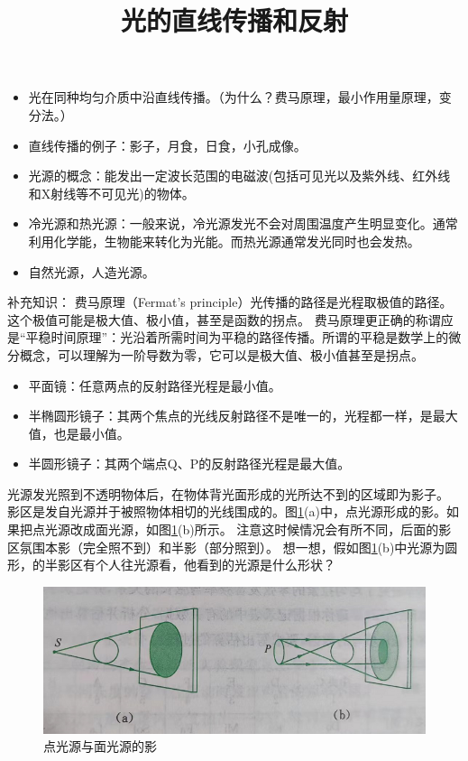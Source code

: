 \documentclass[windows,csize4, answers]{BHCexam}
\title{光的直线传播和反射}
\begin{document}
\maketitle

\begin{groups}
    \begin{itemize}
        \item 光在同种均匀介质中沿直线传播。（为什么？费马原理，最小作用量原理，变分法。）
        \item 直线传播的例子：影子，月食，日食，小孔成像。
        \item 光源的概念：能发出一定波长范围的电磁波(包括可见光以及紫外线、红外线和X射线等不可见光)的物体。
        \item 冷光源和热光源：一般来说，冷光源发光不会对周围温度产生明显变化。通常利用化学能，生物能来转化为光能。而热光源通常发光同时也会发热。
        \item 自然光源，人造光源。
    \end{itemize}

    补充知识： 费马原理（Fermat's principle）光传播的路径是光程取极值的路径。这个极值可能是极大值、极小值，甚至是函数的拐点。
    费马原理更正确的称谓应是“平稳时间原理”：光沿着所需时间为平稳的路径传播。所谓的平稳是数学上的微分概念，可以理解为一阶导数为零，它可以是极大值、极小值甚至是拐点。
    \begin{itemize}
        \item 平面镜：任意两点的反射路径光程是最小值。
        \item 半椭圆形镜子：其两个焦点的光线反射路径不是唯一的，光程都一样，是最大值，也是最小值。
        \item 半圆形镜子：其两个端点Q、P的反射路径光程是最大值。
    \end{itemize}

    光源发光照到不透明物体后，在物体背光面形成的光所达不到的区域即为影子。
    影区是发自光源并于被照物体相切的光线围成的。图\ref{fig:fig_3_1}(a)中，点光源形成的影。如果把点光源改成面光源，如图\ref{fig:fig_3_1}(b)所示。
    注意这时候情况会有所不同，后面的影区氛围本影（完全照不到）和半影（部分照到）。
    想一想，假如图\ref{fig:fig_3_1}(b)中光源为圆形，的半影区有个人往光源看，他看到的光源是什么形状？
    \begin{figure}[htb]
        \centering
        \includegraphics [scale=0.75,trim=0 0 0 0]{./image/fig_3_1.PNG}
        \caption{点光源与面光源的影}
        \label{fig:fig_3_1}
    \end{figure}


\end{groups}
\end{document}
